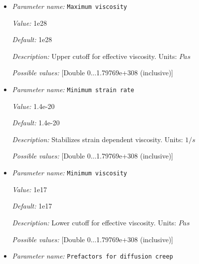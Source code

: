 \begin{itemize}
{\it Value:} 40


{\it Default:} 40


{\it Description:} Maximum number of iterations to find the correct diffusion/dislocation strain rate ratio.


{\it Possible values:} [Integer range 0...2147483647 (inclusive)]
\item {\it Parameter name:} {\tt Maximum viscosity}
\label{parameters:Material model/Diffusion dislocation/Maximum viscosity}


{\it Value:} 1e28


{\it Default:} 1e28


{\it Description:} Upper cutoff for effective viscosity. Units: $Pa s$


{\it Possible values:} [Double 0...1.79769e+308 (inclusive)]
\item {\it Parameter name:} {\tt Minimum strain rate}
\label{parameters:Material model/Diffusion dislocation/Minimum strain rate}


{\it Value:} 1.4e-20


{\it Default:} 1.4e-20


{\it Description:} Stabilizes strain dependent viscosity. Units: $1 / s$


{\it Possible values:} [Double 0...1.79769e+308 (inclusive)]
\item {\it Parameter name:} {\tt Minimum viscosity}
\label{parameters:Material model/Diffusion dislocation/Minimum viscosity}


{\it Value:} 1e17


{\it Default:} 1e17


{\it Description:} Lower cutoff for effective viscosity. Units: $Pa s$


{\it Possible values:} [Double 0...1.79769e+308 (inclusive)]
\item {\it Parameter name:} {\tt Prefactors for diffusion creep}
\label{parameters:Material model/Diffusion dislocation/Prefactors for diffusion creep}



\end{itemize}
